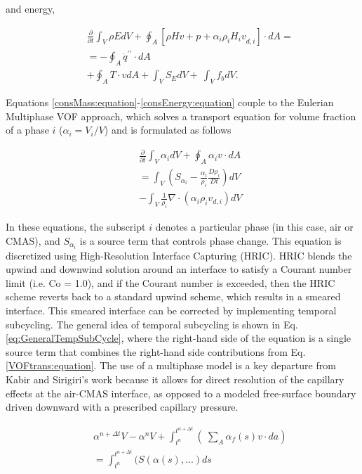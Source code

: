 \documentclass[%
 aip,
 amsmath,amssymb,
 reprint,%
]{revtex4-1}
\begin{document}
\noindent and energy,

\begin{eqnarray}
\label{consEnergy:equation}
   &&\frac{\partial}{\partial t}\int_{V}\rho EdV+\oint_{A}\left[\rho Hv+p+\alpha_i\rho_i{H_iv}_{d,i}\right]\cdot dA=\nonumber \\
   &&=-\oint_{A}{{\dot{q}}^{\prime\prime}\cdot d A} \\
   &&+\oint_{A}{T\cdot v d A}+\int_{V}{S_EdV}+\ \int_{V}{f_bdV}.\nonumber
\end{eqnarray}


\noindent Equations \ref{consMass:equation}-\ref{consEnergy:equation} couple to the Eulerian Multiphase VOF approach, which solves a transport equation for volume fraction of a phase $i$ ($\alpha_{i} = V_{i}/V$) and is formulated as follows 

\begin{eqnarray}
\label{VOFtrans:equation}
    &&\frac{\partial}{\partial t}\int_{V}\alpha_{i}dV+ \oint_{A}\alpha_{i}v\cdot dA\nonumber\\
    &&=\int_{V}\left(S_{\alpha_{i}}-\frac{\alpha_i}{\rho_i}\frac{D\rho_{i}}{Dt}\right)dV\\
    &&-\int_{V} \frac{1}{\rho_{i}}\nabla\cdot \left(\alpha_{i}\rho_{i}v_{d,i}\right)dV\nonumber
\end{eqnarray}

\noindent In these equations, the subscript $i$ denotes a particular phase (in this case, air or CMAS), and $S_{\alpha_{i}}$ is a source term that controls phase change. This equation is discretized using High-Resolution Interface Capturing (HRIC). HRIC blends the upwind and downwind solution around an interface to satisfy a Courant number limit (i.e. Co = 1.0), and if the Courant number is exceeded, then the HRIC scheme reverts back to a standard upwind scheme, which results in a smeared interface. This smeared interface can be corrected by implementing temporal subcycling. The general idea of temporal subcycling is shown in Eq. \ref{eq:GeneralTempSubCycle}, where the right-hand side of the equation is a single source term that combines the right-hand side contributions from Eq. \ref{VOFtrans:equation}. The use of a multiphase model is a key departure from Kabir and Sirigiri's work \cite{Kabir, Sirigiri2018} because it allows for direct resolution of the capillary effects at the air-CMAS interface, as opposed to a modeled free-surface boundary driven downward with a prescribed capillary pressure.

\begin{eqnarray}
\label{eq:GeneralTempSubCycle}
    &&\alpha^{n+\Delta t}V - \alpha^{n}V + \int_{t^{n}}^{t^{n+\Delta t}}( \ \sum_{A}\alpha_{f}(s) v \cdot da)\nonumber\\
    &&=\int_{t^{n}}^{t^{n+\Delta t}}(S(\alpha (s),...)ds
\end{eqnarray}
\end{document}
